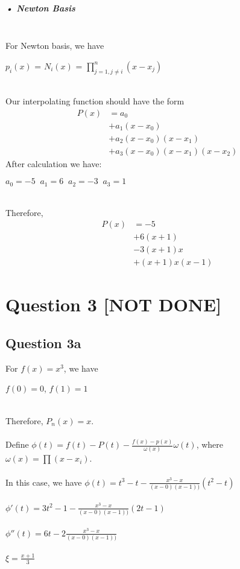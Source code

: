 \documentclass[11pt]{article} %
\begin{document}
\subparagraph{• Newton Basis}\mbox{}\\
For Newton basis, we have\\
\centerline{$p_{i}(x)$ = $N_{i}(x)$ = $\prod_{j=1,j \neq i}^{n}(x-x_{j})$ }\\
Our interpolating function should have the form\\
\begin{equation}
\begin{split}
P(x) &= a_{0}\\
&+a_{1}(x-x_{0})\\
&+a_{2}(x-x_{0})(x-x_{1})\\
&+a_{3}(x-x_{0})(x-x_{1})(x-x_{2})
\end{split}
\end{equation}
After calculation we have:\\
\centerline{$a_{0}=-5\;\;a_{1}=6\;\;a_{2}=-3\;\;a_{3}=1$}\\
Therefore,
\begin{equation}
\begin{split}
P(x) &= -5\\
&+6(x+1)\\
&-3(x+1)x\\
&+(x+1)x(x-1)
\end{split}
\end{equation}
\section{Question 3 [NOT DONE]}
\subsection{Question 3a}
For $f(x) = x^{3}$, we have\\
\centerline{$f(0)=0$, $f(1)=1$}\\
Therefore, $P_{n}(x)=x$.\\\\
Define $\phi(t) = f(t)-P(t)-\frac{f(x)-p(x)}{\omega(x)}\omega(t)$, where $\omega(x) = \prod(x-x_{i})$.\\\\
In this case, we have $\phi(t) = t^{3}-t-\frac{x^{3}-x}{(x-0)(x-1))}(t^{2}-t)$\\\\
$\phi'(t) = 3t^{2}-1-\frac{x^{3}-x}{(x-0)(x-1))}(2t-1)$\\\\
$\phi''(t) = 6t-2\frac{x^{3}-x}{(x-0)(x-1))}$\\\\
$\xi = \frac{x+1}{3}$
\end{document}

